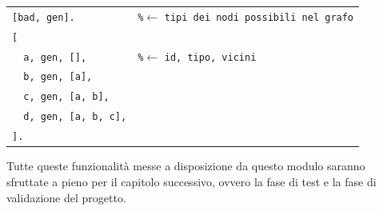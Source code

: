 \documentclass[italian]{memoir}
\begin{document}
\begin{tcolorbox}[colback=yellow!5!white,colframe=lime!75!black,title=Grafo totalmente connesso]
\begin{center}
\begin{tabular}{ll} 
\texttt{[bad, gen].} & \texttt{\%}$\displaystyle \leftarrow$ \texttt{tipi dei nodi possibili nel grafo} \\ 

\texttt{[} &  \\ 

\texttt{~~{a, gen, []},} &  \texttt{\%}$\displaystyle \leftarrow$ \texttt{id, tipo, vicini}\\ 

\texttt{~~{b, gen, [a]},} &  \\ 

\texttt{~~{c, gen, [a, b]},} &  \\ 

\texttt{~~{d, gen, [a, b, c]},} &  \\ 

\texttt{].} &  \\ 
\end{tabular} 
\end{center}
\end{tcolorbox}

Tutte queste funzionalità messe a disposizione da questo modulo saranno sfruttate a pieno per il capitolo successivo, ovvero la fase di test e la fase di validazione del progetto.\\
~\\
\end{document}
